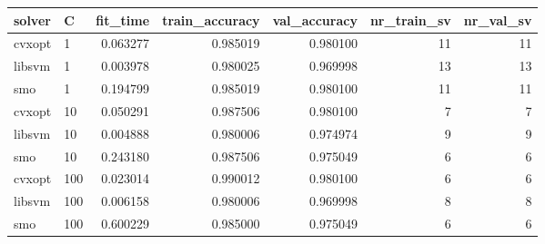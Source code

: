 \begin{tabular}{llrrrrr}
\toprule
solver &   C &  fit\_time &  train\_accuracy &  val\_accuracy &  nr\_train\_sv &  nr\_val\_sv \\
\midrule
cvxopt &   1 &  0.063277 &        0.985019 &      0.980100 &           11 &         11 \\
libsvm &   1 &  0.003978 &        0.980025 &      0.969998 &           13 &         13 \\
   smo &   1 &  0.194799 &        0.985019 &      0.980100 &           11 &         11 \\
cvxopt &  10 &  0.050291 &        0.987506 &      0.980100 &            7 &          7 \\
libsvm &  10 &  0.004888 &        0.980006 &      0.974974 &            9 &          9 \\
   smo &  10 &  0.243180 &        0.987506 &      0.975049 &            6 &          6 \\
cvxopt & 100 &  0.023014 &        0.990012 &      0.980100 &            6 &          6 \\
libsvm & 100 &  0.006158 &        0.980006 &      0.969998 &            8 &          8 \\
   smo & 100 &  0.600229 &        0.985000 &      0.975049 &            6 &          6 \\
\bottomrule
\end{tabular}
